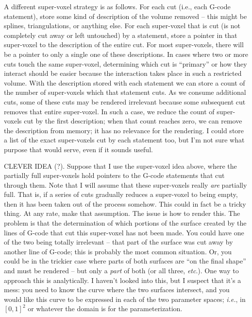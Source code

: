 \documentclass[titlepage,oneside,10pt]{article}
\begin{document}
A different super-voxel strategy is as follows. For each cut (i.e.,
each G-code statement), store some kind of description of the
volume removed -- this might be splines, triangulations, or anything
else. For each super-voxel that is cut (is not completely cut away or
left untouched) by a statement, store a pointer in that super-voxel to
the description of the entire cut. For most super-voxels, there will
be a pointer to only a single one of these descriptions. In cases where two or more cuts touch the
same super-voxel, determining which cut is ``primary'' or how they
interact should be easier because the interaction takes place in such
a restricted volume. With the description stored with each statement
we can store a count of the number of super-voxels which that
statement cuts. As we consume additional cuts, some of these cuts may
be rendered irrelevant because some subsequent cut removes that entire
super-voxel. In such a case, we reduce the count of super-voxels cut
by the first description; when that count reaches zero, we can remove
the description from memory; it has no relevance for the rendering. I
could store a list of the exact super-voxels cut by each statement too,
but I'm not sure what purpose that would serve, even if it sounds
useful.

CLEVER IDEA (?). Suppose that I use the super-voxel idea above, where
the partially full super-voxels hold pointers to the G-code statements
that cut through them. Note that I will assume that these super-voxels
really \emph{are} partially full. That is, if a series of cuts
gradually reduces a super-voxel to being empty, then it has been taken
out of the process somehow. This could in fact be a tricky thing. At
any rate, make that assumption. The issue is how to render this. The
problem is that the determination of which portions of the surface
created by the lines of G-code that cut this super-voxel has not been
made. You could have one of the two being totally irrelevant -- that
part of the surface was cut away by another line of G-code; this is
probably the most common situation. Or, you could be in the trickier
case where parts of both surfaces are ``on the final shape'' and must be
rendered -- but only a \emph{part} of both (or all three,
\emph{etc}.). One way to approach this is analytically. I haven't
looked into this, but I suspect that it's a mess: you need to know the
curve where the two surfaces intersect, and you would like this curve
to be expressed in each of the two parameter spaces; \emph{i.e.}, in
$[0,1]^2$ or whatever the domain is for the parameterization.
\end{document}

